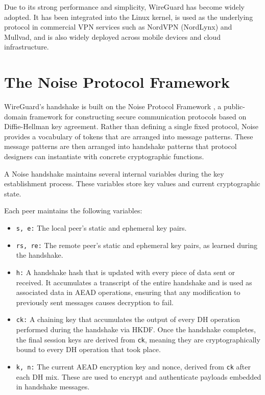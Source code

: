 Due to its strong performance and simplicity, WireGuard has become widely adopted. It has been integrated into the Linux kernel, is used as the underlying protocol in commercial VPN services such as NordVPN (NordLynx) and Mullvad, and is also widely deployed across mobile devices and cloud infrastructure.


\section{The Noise Protocol Framework}
WireGuard's handshake is built on the Noise Protocol Framework \cite{noise}, a public-domain framework for constructing secure communication protocols based on Diffie-Hellman key agreement. Rather than defining a single fixed protocol, Noise provides a vocabulary of tokens that are arranged into message patterns. These message patterns are then arranged into handshake patterns that protocol designers can instantiate with concrete cryptographic functions.

A Noise handshake maintains several internal variables during the key establishment process. These variables store key values and current cryptographic state.

Each peer maintains the following variables:
\begin{itemize}
    \item \texttt{s, e:} The local peer's static and ephemeral key pairs.
    \item \texttt{rs, re:} The remote peer's static and ephemeral key pairs, as learned during the handshake.
    \item \texttt{h:} A handshake hash that is updated with every piece of data sent or received. It accumulates a transcript of the entire handshake and is used as associated data in AEAD operations, ensuring that any modification to previously sent messages causes decryption to fail.
    \item \texttt{ck:} A chaining key that accumulates the output of every DH operation performed during the handshake via HKDF. Once the handshake completes, the final session keys are derived from \texttt{ck}, meaning they are cryptographically bound to every DH operation that took place.
    \item \texttt{k, n:} The current AEAD encryption key and nonce, derived from \texttt{ck} after each DH mix. These are used to encrypt and authenticate payloads embedded in handshake messages.
\end{itemize}

